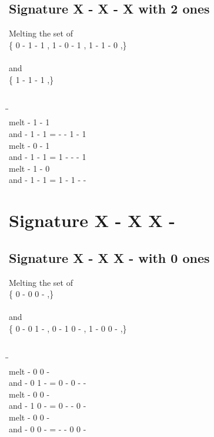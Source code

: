 \documentclass{article}
\begin{document}
\subsection{Signature X - X - X with 2 ones}
Melting the set of\\
\{ 0  -  1  -  1 , 1  -  0  -  1 , 1  -  1  -  0 ,\}\\\\
and\\
\{ 1  -  1  -  1 ,\}\\\\
\begin{tabbing}
\hspace{3cm}\=\hspace{3cm}\=\hspace{3cm}\\[1cm]
melt  -  1  -  1 \\
and  -  1  -  1 \>
 =  -  -  1  -  1 \\[1mm]
melt  -  0  -  1 \\
and  -  1  -  1 \>
 =  1  -  -  -  1 \\[1mm]
melt  -  1  -  0 \\
and  -  1  -  1 \>
 =  1  -  1  -  - \\[1mm]
\end{tabbing}
\newpage
\section{Signature X - X X - }
\subsection{Signature X - X X - with 0 ones}
Melting the set of\\
\{ 0  -  0  0  - ,\}\\\\
and\\
\{ 0  -  0  1  - , 0  -  1  0  - , 1  -  0  0  - ,\}\\\\
\begin{tabbing}
\hspace{3cm}\=\hspace{3cm}\=\hspace{3cm}\\[1cm]
melt  -  0  0  - \\
and  -  0  1  - \>
 =  0  -  0  -  - \\[1mm]
melt  -  0  0  - \\
and  -  1  0  - \>
 =  0  -  -  0  - \\[1mm]
melt  -  0  0  - \\
and  -  0  0  - \>
 =  -  -  0  0  - \\[1mm]
\end{tabbing}
\newpage
\end{document}
